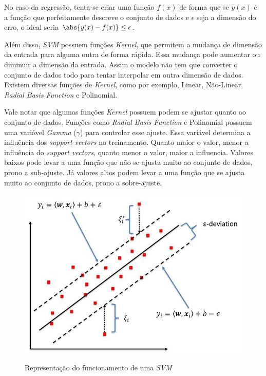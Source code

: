 No caso da regressão, tenta-se criar uma função \(f(x)\) de forma que se \(y(x)\) é a função que perfeitamente descreve o conjunto de dados e \(\epsilon\) seja a dimensão do erro, o ideal seria \(\abs{y(x) - f(x)} \leq \epsilon \).

Além disso, \textit{\acrshort{SVM}} possuem funções \textit{Kernel}, que permitem a mudança de dimensão da entrada para alguma outra de forma rápida. Essa mudança pode aumentar ou diminuir a dimensão da entrada. Assim o modelo não tem que converter o conjunto de dados todo para tentar interpolar em outra dimensão de dados. Existem diversas funções de \textit{Kernel}, como por exemplo, Linear, Não-Linear, \textit{Radial Basis Function} e Polinomial.

Vale notar que algumas funções \textit{Kernel} possuem podem se ajustar quanto ao conjunto de dados. Funções como \textit{Radial Basis Function} e Polinomial possuem uma variável \textit{Gamma} (\(\gamma\)) para controlar esse ajuste. Essa variável determina a influência dos \textit{support vectors} no treinamento. Quanto maior o valor, menor a influência do \textit{support vectors}, quanto menor o valor, maior a influencia. Valores baixos pode levar a uma função que não se ajusta muito ao conjunto de dados, prono a sub-ajuste. Já valores altos podem levar a uma função que se ajusta muito ao conjunto de dados, prono a sobre-ajuste.

\begin{figure}[htbp]
    \centering
    \includegraphics[scale=1.0]{monography/img/models/svr_example.png}
    \label{figure:support_vector_machine}
    \caption[Representação do funcionamento de uma \textit{\acrshort{SVM}}]{Representação do funcionamento de uma \textit{\acrshort{SVM}}\footnotemark}
\end{figure}

